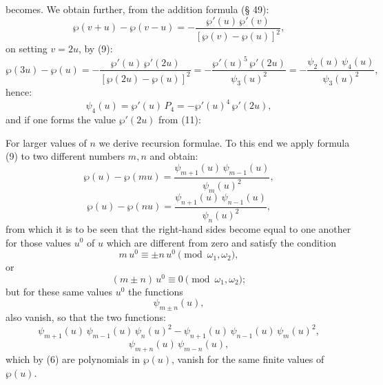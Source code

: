 
becomes. We obtain further, from the addition formula (§ 49):
\[
\wp(v+u) - \wp(v-u) = -\frac{\wp'(u)\,\wp'(v)}{\left[\wp(v)-\wp(u)\right]^2},
\]
on setting $v=2u$, by (9):
\[
\wp(3u) - \wp(u) = -\frac{\wp'(u)\,\wp'(2u)}{\left[\wp(2u)-\wp(u)\right]^2}
= -\frac{\wp'(u)^5\,\wp'(2u)}{\psi_3(u)^2} = -\frac{\psi_2(u)\,\psi_4(u)}{\psi_3(u)^2},
\]
hence:
\[
\psi_4(u) = \wp'(u)\,P_4 = -\wp'(u)^4\,\wp'(2u),
\]
and if one forms the value $\wp'(2u)$ from (11):

For larger values of $n$ we derive recursion formulae. To this end we
apply formula (9) to two different numbers $m, n$ and obtain:
\[
\wp(u) - \wp(mu) = \frac{\psi_{m+1}(u)\,\psi_{m-1}(u)}{\psi_m(u)^2},
\]
\[
\wp(u) - \wp(nu) = \frac{\psi_{n+1}(u)\,\psi_{n-1}(u)}{\psi_n(u)^2},
\]
from which it is to be seen that the right-hand sides become equal to one
another for those values $u^0$ of $u$ which are different from zero and
satisfy the condition
\[
m\,u^0 \equiv \pm n\,u^0 \pmod{\omega_1,\omega_2},
\]
or
\[
(m\pm n)\,u^0 \equiv 0 \pmod{\omega_1,\omega_2};
\]
but for these same values $u^0$ the functions
\[
\psi_{m\pm n}(u),
\]
also vanish, so that the two functions:
\[
\psi_{m+1}(u)\,\psi_{m-1}(u)\,\psi_n(u)^2 - \psi_{n+1}(u)\,\psi_{n-1}(u)\,\psi_m(u)^2,
\]
\[
\psi_{m+n}(u)\,\psi_{m-n}(u),
\]
which by (6) are polynomials in $\wp(u)$, vanish for the
same finite values of $\wp(u)$.
